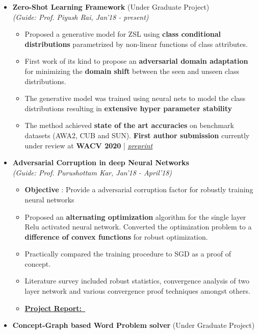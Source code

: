\documentclass[a4paper,10pt]{article}
\newcommand{\isep}{-2 pt}
\begin{document}
\begin{itemize}
\item \textbf{Zero-Shot Learning Framework} (Under Graduate Project)\\
 \emph{(Guide: Prof. Piyush Rai, Jan'18 - present)} \\[-0.6cm]
	\begin{itemize}\itemsep \isep
	\item Proposed a generative model for ZSL using \textbf{class conditional distributions} parametrized by non-linear functions of class attributes.
	\item First work of its kind to propose an \textbf{adversarial domain adaptation} for minimizing the \textbf{domain shift} between the seen and unseen class distributions.
	\item The generative model was trained using neural nets to model the class distributions resulting in \textbf{extensive hyper parameter stability}
	\item The method achieved \textbf{state of the art accuracies} on benchmark datasets (AWA2, CUB and SUN). \textbf{First author submission} currently under review at \textbf{WACV 2020} | \href{https://arxiv.org/abs/1906.03038}{\textit{preprint \faExternalLink}}
	\end{itemize}
\item \textbf{Adversarial Corruption in deep Neural Networks} \\
 \emph{(Guide: Prof. Purushottam Kar, Jan'18 - April'18)} \\[-0.6cm]
	\begin{itemize}\itemsep \isep
	\item \textbf{Objective} : Provide a adversarial corruption factor for robustly training neural networks
	\item Proposed an \textbf{alternating optimization} algorithm for the single layer Relu activated neural network. Converted the optimization problem to a \textbf{difference of convex functions} for robust optimization.
	\item Practically compared the training procedure to SGD as a proof of concept.
	\item Literature survey included robust statistics, convergence analysis of two layer network and various convergence proof techniques amongst others.
	\item  \href{http://home.iitk.ac.in/~varun/CS777.pdf}{\textbf{Project Report:}\ \faExternalLink}
	\end{itemize}
\item \textbf{Concept-Graph based Word Problem solver} (Under Graduate Project) \\

\end{itemize}
\end{document}
